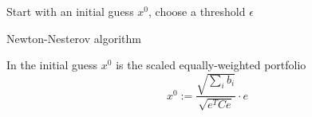 \begin{algorithm}
Start with an initial guess $x^{0}$, choose a threshold $\epsilon$\\
\caption{Newton-Nesterov algorithm}
\label{alg:nesterov}
\end{algorithm}

In \cite{spinu} the initial guess $x^{0}$ is the scaled equally-weighted portfolio
\begin{equation}
x^{0} := \frac{\sqrt{\sum_i b_i}}{\sqrt{e^T C e}} \cdot e
\end{equation}

